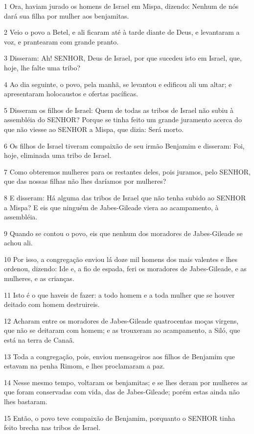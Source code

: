 \par 1 Ora, haviam jurado os homens de Israel em Mispa, dizendo: Nenhum de nós dará sua filha por mulher aos benjamitas.
\par 2 Veio o povo a Betel, e ali ficaram até à tarde diante de Deus, e levantaram a voz, e prantearam com grande pranto.
\par 3 Disseram: Ah! SENHOR, Deus de Israel, por que sucedeu isto em Israel, que, hoje, lhe falte uma tribo?
\par 4 Ao dia seguinte, o povo, pela manhã, se levantou e edificou ali um altar; e apresentaram holocaustos e ofertas pacíficas.
\par 5 Disseram os filhos de Israel: Quem de todas as tribos de Israel não subiu à assembléia do SENHOR? Porque se tinha feito um grande juramento acerca do que não viesse ao SENHOR a Mispa, que dizia: Será morto.
\par 6 Os filhos de Israel tiveram compaixão de seu irmão Benjamim e disseram: Foi, hoje, eliminada uma tribo de Israel.
\par 7 Como obteremos mulheres para os restantes deles, pois juramos, pelo SENHOR, que das nossas filhas não lhes daríamos por mulheres?
\par 8 E disseram: Há alguma das tribos de Israel que não tenha subido ao SENHOR a Mispa? E eis que ninguém de Jabes-Gileade viera ao acampamento, à assembléia.
\par 9 Quando se contou o povo, eis que nenhum dos moradores de Jabes-Gileade se achou ali.
\par 10 Por isso, a congregação enviou lá doze mil homens dos mais valentes e lhes ordenou, dizendo: Ide e, a fio de espada, feri os moradores de Jabes-Gileade, e as mulheres, e as crianças.
\par 11 Isto é o que haveis de fazer: a todo homem e a toda mulher que se houver deitado com homem destruireis.
\par 12 Acharam entre os moradores de Jabes-Gileade quatrocentas moças virgens, que não se deitaram com homem; e as trouxeram ao acampamento, a Siló, que está na terra de Canaã.
\par 13 Toda a congregação, pois, enviou mensageiros aos filhos de Benjamim que estavam na penha Rimom, e lhes proclamaram a paz.
\par 14 Nesse mesmo tempo, voltaram os benjamitas; e se lhes deram por mulheres as que foram conservadas com vida, das de Jabes-Gileade; porém estas ainda não lhes bastaram.
\par 15 Então, o povo teve compaixão de Benjamim, porquanto o SENHOR tinha feito brecha nas tribos de Israel.
